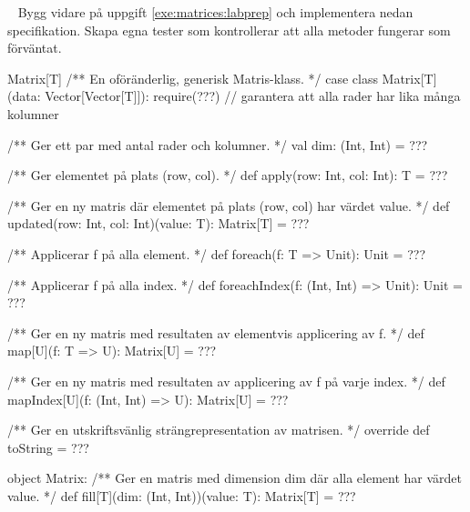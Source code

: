 \QUESTEND


\QUESTBEGIN

\Task \what~ Bygg vidare på uppgift \ref{exe:matrices:labprep} och implementera nedan specifikation. Skapa egna tester som kontrollerar att alla metoder fungerar som förväntat.

\begin{ScalaSpec}{Matrix[T]}
/** En oföränderlig, generisk Matris-klass. */
case class Matrix[T](data: Vector[Vector[T]]):
  require(???)  // garantera att alla rader har lika många kolumner

  /** Ger ett par med antal rader och kolumner. */
  val dim: (Int, Int) = ???

  /** Ger elementet på plats (row, col). */
  def apply(row: Int, col: Int): T = ???

  /** Ger en ny matris där elementet på plats (row, col) har värdet value. */
  def updated(row: Int, col: Int)(value: T): Matrix[T] =  ???

  /** Applicerar f på alla element. */
  def foreach(f: T => Unit): Unit = ???

  /** Applicerar f på alla index. */
  def foreachIndex(f: (Int, Int) => Unit): Unit = ???

  /** Ger en ny matris med resultaten av elementvis applicering av f. */
  def map[U](f: T => U): Matrix[U] = ???

  /** Ger en ny matris med resultaten av applicering av f på varje index. */
  def mapIndex[U](f: (Int, Int) => U): Matrix[U] = ???

  /** Ger en utskriftsvänlig strängrepresentation av matrisen. */
  override def toString = ???

object Matrix:
  /** Ger en matris med dimension dim där alla element har värdet value. */
  def fill[T](dim: (Int, Int))(value: T): Matrix[T] = ???
\end{ScalaSpec}

\SOLUTION


\TaskSolved \what

